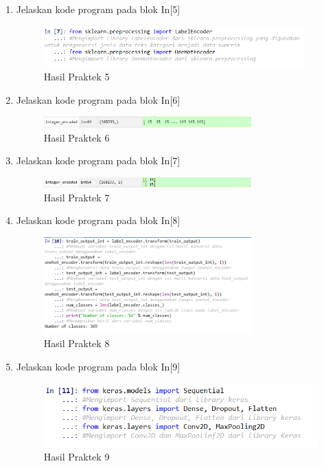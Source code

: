 \begin{enumerate}
\item Jelaskan kode program pada blok  In[5]

\begin{figure}[H]
	\centering
	\includegraphics[width=10cm]{figures/1174084/7/5.png}
	\caption{Hasil Praktek 5}
\end{figure}

\item Jelaskan kode program pada blok  In[6]
		
\begin{figure}[H]
    \includegraphics[width=8cm]{figures/1174084/7/6.png}
    \centering
    \caption{Hasil Praktek 6}
\end{figure}


\item Jelaskan kode program pada blok In[7]

\begin{figure}[H]
    \includegraphics[width=8cm]{figures/1174084/7/7.png}
    \centering
    \caption{Hasil Praktek 7}
\end{figure}


\item Jelaskan kode program pada blok In[8]

\begin{figure}[H]
    \includegraphics[width=8cm]{figures/1174084/7/8.png}
    \centering
    \caption{Hasil Praktek 8}
\end{figure}

\item Jelaskan kode program pada blok In[9]

\begin{figure}[H]
    \includegraphics[width=12cm]{figures/1174084/7/9.png}
    \centering
    \caption{Hasil Praktek 9}
\end{figure}


\end{enumerate}
